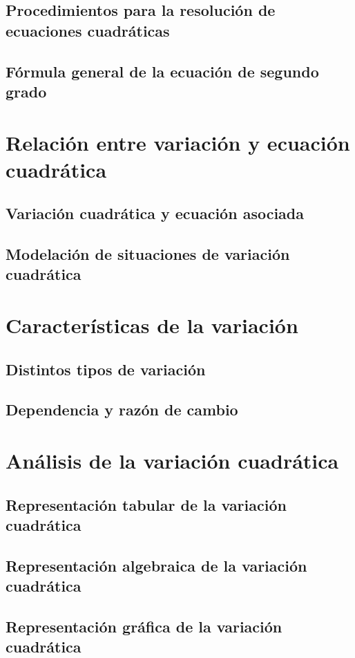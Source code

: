\documentclass[11pt]{book}
\begin{document}
\subsection{Procedimientos para la resolución de ecuaciones cuadráticas}
\subsection{Fórmula general de la ecuación de segundo grado}

\section{Relación entre variación y ecuación cuadrática}
\subsection{Variación cuadrática y ecuación asociada}
\subsection{Modelación de situaciones de variación cuadrática}

\section{Características de la variación}
\subsection{Distintos tipos de variación}
\subsection{Dependencia y razón de cambio}

\section{Análisis de la variación cuadrática}
\subsection{Representación tabular de la variación cuadrática}
\subsection{Representación algebraica de la variación cuadrática}
\subsection{Representación gr\'afica de la variación cuadrática}
\end{document}
